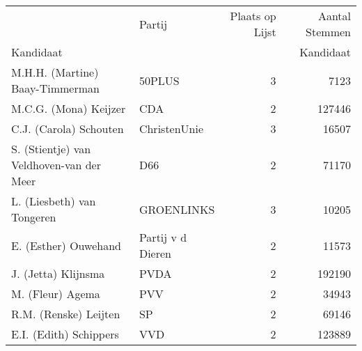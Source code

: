 \begin{tabular}{llrr}
\toprule
{} &                 Partij &  Plaats op Lijst &  Aantal Stemmen  \\
Kandidaat                                &                        &                  &    Kandidaat                       \\
\midrule
M.H.H. (Martine) Baay-Timmerman          &                 50PLUS &                3 &                      7123 \\
M.C.G. (Mona) Keijzer                    &                    CDA &                2 &                    127446 \\
C.J. (Carola) Schouten                   &           ChristenUnie &                3 &                     16507 \\
S. (Stientje) van Veldhoven-van der Meer &                    D66 &                2 &                     71170 \\
L. (Liesbeth) van Tongeren               &             GROENLINKS &                3 &                     10205 \\
E. (Esther) Ouwehand                     &  Partij v d Dieren &                2 &                     11573 \\
J. (Jetta) Klijnsma                      &                   PVDA &                2 &                    192190 \\
M. (Fleur) Agema                         &                    PVV &                2 &                     34943 \\
R.M. (Renske) Leijten                    &                     SP &                2 &                     69146 \\
E.I. (Edith) Schippers                   &                    VVD &                2 &                    123889 \\
\bottomrule
\end{tabular}

